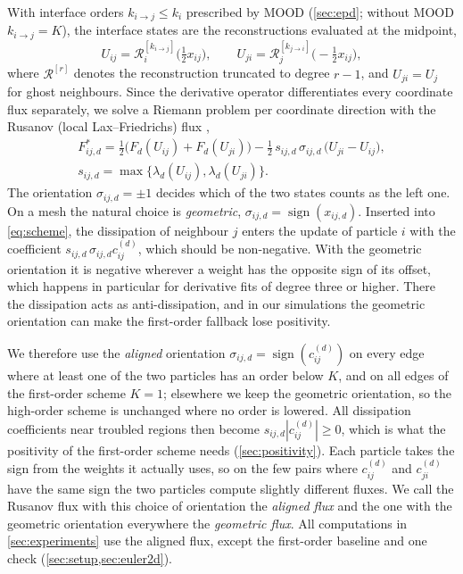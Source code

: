 \documentclass[smallextended]{svjour3}
\numberwithin{equation}{section}
\newcommand{\Fs}{F^{*}}
\newcommand{\sgn}{\operatorname{sign}}
\newcommand{\ord}[2]{k_{#1\to #2}}
\begin{document}
With interface orders $\ord ij\le k_i$ prescribed by MOOD (\cref{sec:epd}; without MOOD $\ord ij=K$), the interface states are the reconstructions evaluated at the midpoint,
\begin{equation}\label{eq:states}
U_{ij} = \mathcal{R}^{[\ord ij]}_i\big(\tfrac12 x_{ij}\big),\qquad U_{ji}=\mathcal{R}^{[\ord ji]}_j\big(-\tfrac12 x_{ij}\big),
\end{equation}
where $\mathcal{R}^{[r]}$ denotes the reconstruction truncated to degree $r-1$, and $U_{ji}=U_j$ for ghost neighbours. Since the derivative operator differentiates every coordinate flux separately, we solve a Riemann problem per coordinate direction with the Rusanov (local Lax--Friedrichs) flux \cite{Toro2009},
\begin{equation}\label{eq:rusanov}
\begin{gathered}
\Fs_{ij,d} = \tfrac12\big(F_d(U_{ij})+F_d(U_{ji})\big) - \tfrac12\,s_{ij,d}\,\sigma_{ij,d}\,\big(U_{ji}-U_{ij}\big),\\
s_{ij,d} = \max\{\lambda_d(U_{ij}),\lambda_d(U_{ji})\}.
\end{gathered}
\end{equation}
The orientation $\sigma_{ij,d}=\pm1$ decides which of the two states counts as the left one. On a mesh the natural choice is \emph{geometric}, $\sigma_{ij,d}=\sgn(x_{ij,d})$. Inserted into \eqref{eq:scheme}, the dissipation of neighbour $j$ enters the update of particle $i$ with the coefficient $s_{ij,d}\,\sigma_{ij,d}c^{(d)}_{ij}$, which should be non-negative. With the geometric orientation it is negative wherever a weight has the opposite sign of its offset, which happens in particular for derivative fits of degree three or higher. There the dissipation acts as anti-dissipation, and in our simulations the geometric orientation can make the first-order fallback lose positivity.

We therefore use the \emph{aligned} orientation $\sigma_{ij,d}=\sgn(c^{(d)}_{ij})$ on every edge where at least one of the two particles has an order below $K$, and on all edges of the first-order scheme $K=1$; elsewhere we keep the geometric orientation, so the high-order scheme is unchanged where no order is lowered. All dissipation coefficients near troubled regions then become $s_{ij,d}|c^{(d)}_{ij}|\ge0$, which is what the positivity of the first-order scheme needs (\cref{sec:positivity}). Each particle takes the sign from the weights it actually uses, so on the few pairs where $c^{(d)}_{ij}$ and $c^{(d)}_{ji}$ have the same sign the two particles compute slightly different fluxes. We call the Rusanov flux with this choice of orientation the \emph{aligned flux} and the one with the geometric orientation everywhere the \emph{geometric flux}. All computations in \cref{sec:experiments} use the aligned flux, except the first-order baseline and one check (\cref{sec:setup,sec:euler2d}).
\end{document}

